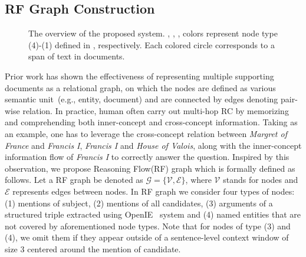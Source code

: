 \subsection{RF Graph Construction}
\label{sec:RF}
\begin{figure*}[t]
	\centering
	\caption{The overview of the proposed system. {\color{brown}{Brown}}, {\color{green}{green}}, {\color{orange}{orange}}, {\color{blue}{blue}} colors represent node type (4)-(1) defined in , respectively. Each colored circle corresponds to a span of text in documents.} \label{fig:overview}
\end{figure*}
Prior work has shown the effectiveness of representing multiple supporting documents as a relational graph, on which the nodes are defined as various semantic unit~(e.g., entity, document) and are connected by edges denoting pair-wise relation. In practice, human often carry out multi-hop RC by memorizing and comprehending both inner-concept and cross-concept information. Taking  as an example, one has to leverage the cross-concept relation between \textit{Margret of France} and \textit{Francis I}, \textit{Francis I} and \textit{House of Valois}, along with the inner-concept information flow of \textit{Francis I} to correctly answer the question. Inspired by this observation, we propose Reasoning Flow(RF) graph which is formally defined as follows.
Let a RF graph be denoted as $\mathcal{G}=\{\mathcal{V}, \mathcal{E}\}$, where $\mathcal{V}$ stands for nodes and $\mathcal{E}$ represents edges between nodes. In RF graph we consider four types of nodes: (1) mentions of subject, (2) mentions of all candidates, (3) arguments of a structured triple extracted using OpenIE~\cite{Gardner2017AllenNLP} system and (4) named entities that are not covered by aforementioned node types. Note that for nodes of type (3) and (4), we omit them if they appear outside of a sentence-level context window of size $3$ centered around the mention of candidate.

